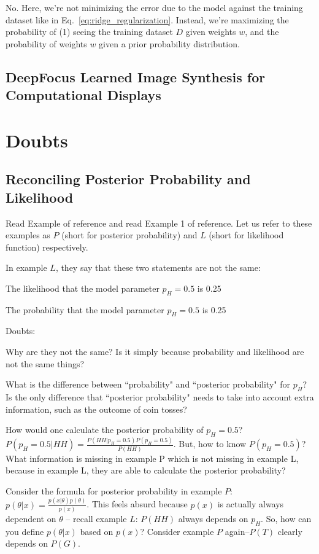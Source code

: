  No. Here, we're not minimizing the error due to the model against the training dataset like in Eq.~\ref{eq:ridge_regularization}. Instead, we're maximizing the probability of (1) seeing the training dataset $D$ given weights $w$, and the probability of weights $w$ given a prior probability distribution. 

\subsection{DeepFocus Learned Image Synthesis for Computational Displays}
\label{sec:DeepFocus}

\section{Doubts}
\label{sec:doubts}
\subsection{Reconciling Posterior Probability and Likelihood}
Read Example of reference\cite{WikiPosteriorProbability} and read Example 1 of reference\cite{WikiLikelihoodFunction}. Let us refer to these examples as $P$ (short for posterior probability) and $L$ (short for likelihood function) respectively.

In example $L$, they say that these two statements are not the same:
\begin{packed_enumerate}
\item The likelihood that the model parameter $p_H = 0.5$  is 0.25
\item The probability that the model parameter $p_H = 0.5$  is 0.25
\end{packed_enumerate}

Doubts:
\begin{packed_enumerate}
\item Why are they not the same? Is it simply because probability and likelihood are not the same things? 
\item What is the difference between ``probability" and ``posterior probability" for $p_H$? Is the only difference that ``posterior probability" needs to take into account extra information, such as the outcome of coin tosses?
\item How would one calculate the posterior probability of $p_H = 0.5$? $P(p_H = 0.5|HH) = \frac{P(HH|p_H = 0.5)P(p_H=0.5)}{P(HH)}$. But, how to know $P(p_H=0.5)$? What information is missing in example P which is not missing in example L, because in example L, they are able to calculate the posterior probability?
\item Consider the formula for posterior probability in example $P$: $p(\theta|x) = \frac{p(x|\theta)p(\theta)}{p(x)}$. This feels absurd because $p(x)$ is actually always dependent on $\theta$ -- recall example $L$: $P(HH)$ always depends on $p_H$. So, how can you define $p(\theta|x)$ based on $p(x)$? Consider example $P$ again--$P(T)$ clearly depends on $P(G)$. 
\end{packed_enumerate}

